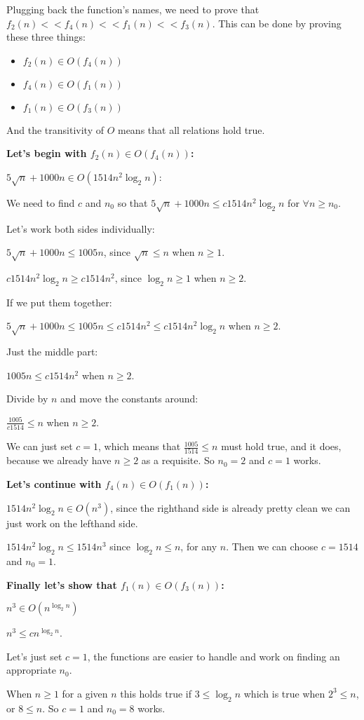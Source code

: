 Plugging back the function's names, we need to prove that $f_2(n) << f_4(n) << f_1(n) << f_3(n)$. This can be done by proving these three things:

\begin{itemize}
    \item $f_2(n) \in O(f_4(n))$
    \item $f_4(n) \in O(f_1(n))$
    \item $f_1(n) \in O(f_3(n))$
\end{itemize}

And the transitivity of $O$ means that all relations hold true.

\textbf{Let's begin with $f_2(n) \in O(f_4(n))$:}

$5\sqrt{n} + 1000n \in O(1514n^{2}\log_{2}n)$:

We need to find $c$ and $n_0$ so that
$5\sqrt{n} + 1000n \leq{} c1514n^{2}\log_{2}n$ for $\forall{}n\geq{}n_0$.

Let's work both sides individually:

$5\sqrt{n} + 1000n \leq{} 1005n$, since $\sqrt{n} \leq{} n$ when $n\geq{}1$.

$c1514n^{2}\log_{2}n \geq{} c1514n^{2}$, since $\log_2{n} \geq{} 1$ when $n\geq{}2$.

If we put them together:

$5\sqrt{n} + 1000n \leq{} 1005n \leq{} c1514n^{2} \leq{} c1514n^{2}\log_{2}n$ when $n\geq{}2$.

Just the middle part:

$1005n \leq{} c1514n^{2}$ when $n\geq{}2$.

Divide by $n$ and move the constants around:

$\frac{1005}{c1514} \leq{} n$ when $n\geq{}2$.

We can just set $c=1$, which means that $\frac{1005}{1514} \leq{} n$ must hold true, and it does, because we already have $n\geq{}2$ as a requisite. So $n_0=2$ and $c=1$ works.

\textbf{Let's continue with $f_4(n) \in O(f_1(n))$:}

$1514n^{2}\log_{2}n \in{} O(n^3)$, since the righthand side is already pretty clean we can just work on the lefthand side.

$1514n^{2}\log_{2}n \leq{} 1514n^3$ since $\log_{2}n\leq{}n$, for any $n$. Then we can choose $c=1514$ and $n_0=1$.

\textbf{Finally let's show that $f_1(n) \in O(f_3(n))$:}

$n^3 \in{} O(n^{\log_{2}n})$

$n^3 \leq{} cn^{\log_{2}n}$.

Let's just set $c=1$, the functions are easier to handle and work on finding an appropriate $n_0$.

When $n\geq{}1$ for a given $n$ this holds true if $3 \leq{} \log_{2}n$ which is true when $2^3 \leq{} n$, or $8 \leq{} n$. So $c=1$ and $n_0 = 8$ works.